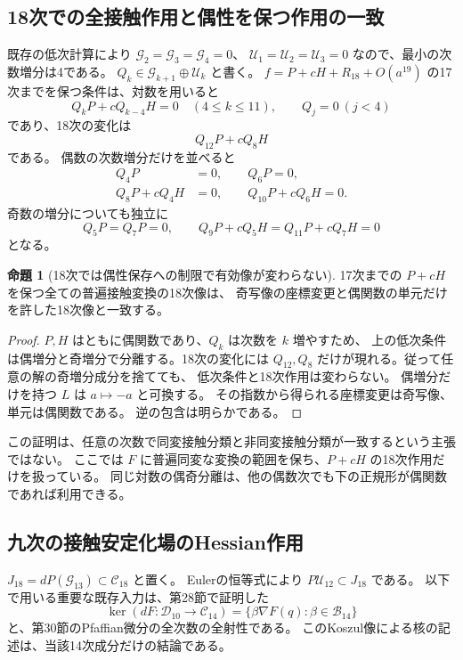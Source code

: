 \documentclass[a4paper,11pt]{ltjsarticle}
\theoremstyle{definition}
\newtheorem{proposition}[theorem]{命題}
\begin{document}
\subsection{18次での全接触作用と偶性を保つ作用の一致}

既存の低次計算により $\mathcal G_2=\mathcal G_3=\mathcal G_4=0$、
$\mathcal U_1=\mathcal U_2=\mathcal U_3=0$ なので、最小の次数増分は4である。
$Q_k\in\mathcal G_{k+1}\oplus\mathcal U_k$ と書く。
$f=P+cH+R_{18}+O(a^{19})$ の17次までを保つ条件は、対数を用いると
\[
 Q_kP+cQ_{k-4}H=0\quad(4\le k\le11),
 \qquad Q_j=0\ (j<4)
\]
であり、18次の変化は
\[
 Q_{12}P+cQ_8H
\]
である。
偶数の次数増分だけを並べると
\begin{equation}\label{eq:v14-even-stabilizer-chain}
 \begin{split}
 Q_4P&=0,\qquad Q_6P=0,\\
 Q_8P+cQ_4H&=0,\qquad Q_{10}P+cQ_6H=0.
 \end{split}
\end{equation}
奇数の増分についても独立に
\[
 Q_5P=Q_7P=0,\qquad
 Q_9P+cQ_5H=Q_{11}P+cQ_7H=0
\]
となる。

\begin{proposition}[18次では偶性保存への制限で有効像が変わらない]
\label{prop:v14-parity-restriction}
17次までの $P+cH$ を保つ全ての普遍接触変換の18次像は、
奇写像の座標変更と偶関数の単元だけを許した18次像と一致する。
\end{proposition}

\begin{proof}
$P,H$ はともに偶関数であり、$Q_k$ は次数を $k$ 増やすため、
上の低次条件は偶増分と奇増分で分離する。18次の変化には
$Q_{12},Q_8$ だけが現れる。従って任意の解の奇増分成分を捨てても、
低次条件と18次作用は変わらない。
偶増分だけを持つ $L$ は $a\mapsto-a$ と可換する。
その指数から得られる座標変更は奇写像、単元は偶関数である。
逆の包含は明らかである。
\end{proof}

この証明は、任意の次数で同変接触分類と非同変接触分類が一致するという主張ではない。
ここでは $F$ に普遍同変な変換の範囲を保ち、$P+cH$ の18次作用だけを扱っている。
同じ対数の偶奇分離は、他の偶数次でも下の正規形が偶関数であれば利用できる。

\subsection{九次の接触安定化場のHessian作用}

$J_{18}=dP(\mathcal G_{13})\subset\mathcal C_{18}$ と置く。
Eulerの恒等式により $P\mathcal U_{12}\subset J_{18}$ である。
以下で用いる重要な既存入力は、第28節で証明した
\[
 \ker(dF:\mathcal D_{10}\to\mathcal C_{14})
       =\{\beta\nabla F(q):\beta\in\mathcal B_{14}\}
\]
と、第30節のPfaffian微分の全次数の全射性である。
このKoszul像による核の記述は、当該14次成分だけの結論である。
\end{document}
